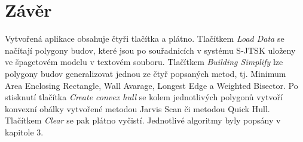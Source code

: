 \documentclass[11pt]{article}
\begin{document}
	\section{Závěr}
	Vytvořená aplikace obsahuje čtyři tlačítka a plátno. Tlačítkem \textit{Load Data} se načítají polygony budov, které jsou po souřadnicích v systému S-JTSK uloženy ve špagetovém modelu v textovém souboru. Tlačítkem \textit{Building Simplify} lze polygony budov generalizovat jednou ze čtyř popsaných metod, tj. Minimum Area Enclosing Rectangle, Wall Avarage, Longest Edge a Weighted Bisector. Po stisknutí tlačítka \textit{Create convex hull} se kolem jednotlivých polygonů vytvoří konvexní obálky vytvořené metodou Jarvis Scan či metodou Quick Hull. Tlačítkem \textit{Clear} se pak plátno vyčistí. Jednotlivé algoritmy byly popsány v kapitole 3.	
		
		

		
	
\end{document}
